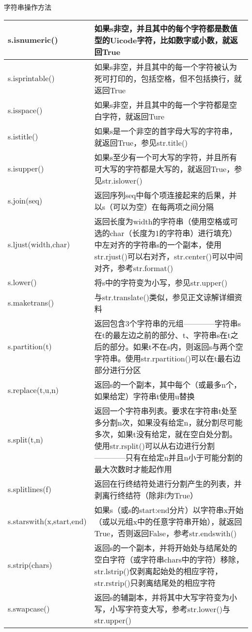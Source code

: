 \begin{frame}{字符串操作方法}
\begin{center}
\begin{longtable}{p{} | p{}}
      s.isnumeric() & 如果s非空，并且其中的每个字符都是数值型的Uicode字符，比如数字或小数，就返回True \\ \hline
      s.isprintable() & 如果s非空，并且其中的每一个字符被认为死可打印的，包括空格，但不包括换行，就返回True \\ \hline
      s.isspace() & 如果s非空，并且其中的每一个字符都是空白字符，就返回Ture \\ \hline
      s.istitle() & 如果s是一个非空的首字母大写的字符串，就返回True，参见str.title() \\ \hline
      s.isupper() & 如果s至少有一个可大写的字符，并且所有可大写的字符都是大写的，就返回True，参见str.islower() \\ \hline
      s.join(seq) & 返回序列seq中每个项连接起来的后果，并以s（可以为空）在每两项之间分隔 \\ \hline
      s.ljust(width,char) & 返回长度为width的字符串（使用空格或可选的char（长度为1的字符串）进行填充）中左对齐的字符串s的一个副本，使用str.rjust()可以右对齐，str.center()可以中间对齐，参考str.format() \\ \hline
      s.lower() & 将s中的字符变为小写，参见str.upper() \\ \hline
      s.maketrans() & 与str.translate()类似，参见正文谅解详细资料 \\ \hline
      s.partition(t) & 返回包含3个字符串的元组————字符串s在t的最左边之前的部分、t、字符串s在t之后的部分。如果t不在s内，则返回s与两个空字符串。使用str.rpartition()可以在t最右边部分进行分区 \\ \hline
      s.replace(t,u,n) & 返回s的一个副本，其中每个（或最多n个，如果给定）字符串t使用u替换 \\ \hline
      s.split(t,n) & 返回一个字符串列表。要求在字符串t处至多分割n次，如果没有给定n，就分割尽可能多次，如果t没有给定，就在空白处分割。使用str.rsplit()可以从右边进行分割————只有在给定n并且n小于可能分割的最大次数时才能起作用 \\ \hline
      s.splitlines(f) & 返回在行终结符处进行分割产生的列表，并剥离行终结符（除非f为True） \\ \hline
      s.starswith(x,start,end) & 如果s（或s的start:end分片）以字符串x开始（或以元组x中的任意字符串开始），就返回True，否则返回False，参考str.endswith() \\ \hline
      s.strip(chars) & 返回s的一个副本，并将开始处与结尾处的空白字符（或字符串chars中的字符）移除，str.lstrip()仅剥离起始处的相应字符，str.rstrip()只剥离结尾处的相应字符 \\ \hline
      s.swapcase() & 返回s的辅副本，并将其中大写字符变为小写，小写字符变大写，参考str.lower()与str.upper() \\ \hline

\end{longtable}
\end{center}
\end{frame}
